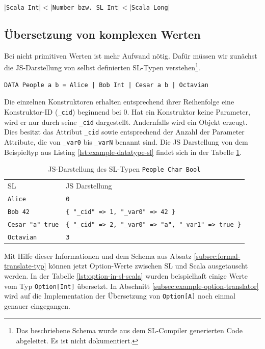 \documentclass[12pt,bibtotoc]{scrreprt}
\begin{document}
\begin{center}
$|$\lstinline!Scala Int!$| < |$\lstinline!Number bzw. SL Int!$| < |$\lstinline!Scala Long!$|$
\end{center}

\subsection{Übersetzung von komplexen Werten}

Bei nicht primitiven Werten ist mehr Aufwand nötig. Dafür müssen wir zunächst die JS-Darstellung von selbst definierten SL-Typen verstehen\footnote{Das beschriebene Schema wurde aus dem SL-Compiler generierten Code abgeleitet. Es ist nicht dokumentiert.}.

\begin{lstlisting}[caption=Beispiel eines selbst definierten Typs, label=lst:example-datatype-sl]
DATA People a b = Alice | Bob Int | Cesar a b | Octavian
\end{lstlisting}

Die einzelnen Konstruktoren erhalten entsprechend ihrer Reihenfolge eine Konstruktor-ID (\lstinline!_cid!) beginnend bei $0$. Hat ein Konstruktor keine Parameter, wird er nur durch seine \lstinline!_cid! dargestellt. Andernfalls wird ein Objekt erzeugt. Dies besitzt das Attribut \lstinline!_cid! sowie entsprechend der Anzahl der Parameter Attribute, die von \lstinline!_var0! bis \lstinline!_varN! benannt sind. Die JS Darstellung von dem Beispieltyp aus Listing \ref{lst:example-datatype-sl} findet sich in der Tabelle \ref{tab:js-code-of-people}.

\begin{table}[h]
\caption{JS-Darstellung des SL-Typen \lstinline!People Char Bool!}
\centering
\begin{tabular}{ll}
 \ac{SL}              &  \ac{JS} Darstellung \\
\lstinline!Alice!           &  \lstinline!0! \\
\lstinline!Bob 42!          &  \lstinline!{ "_cid" => 1, "_var0" => 42 }! \\
\lstinline!Cesar "a" true!  &  \lstinline!{ "_cid" => 2, "_var0" => "a", "_var1" => true }! \\
\lstinline!Octavian!        &  \lstinline!3! \\
\end{tabular}
\label{tab:js-code-of-people}
\end{table}

Mit Hilfe dieser Informationen und dem Schema aus Absatz \ref{subsec:formal-translate-typ} können jetzt Option-Werte zwischen SL und Scala ausgetauscht werden. In der Tabelle \ref{lst:option-in-sl-scala} wurden beispielhaft einige Werte vom Typ \lstinline!Option[Int]! übersetzt. In Abschnitt \ref{subsec:example-option-translator} wird auf die Implementation der Übersetzung von \lstinline!Option[A]! noch einmal genauer eingegangen.
\end{document}
